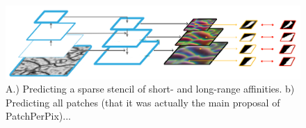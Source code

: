 





\begin{figure}[t]
\centering
        \includegraphics[width=\textwidth]{./figs/main_image.pdf} %
        \caption{A.) Predicting a sparse stencil of short- and long-range affinities. b) Predicting all patches (that it was actually the main proposal of PatchPerPix)...}
    \label{fig:main_figure}
\end{figure}


